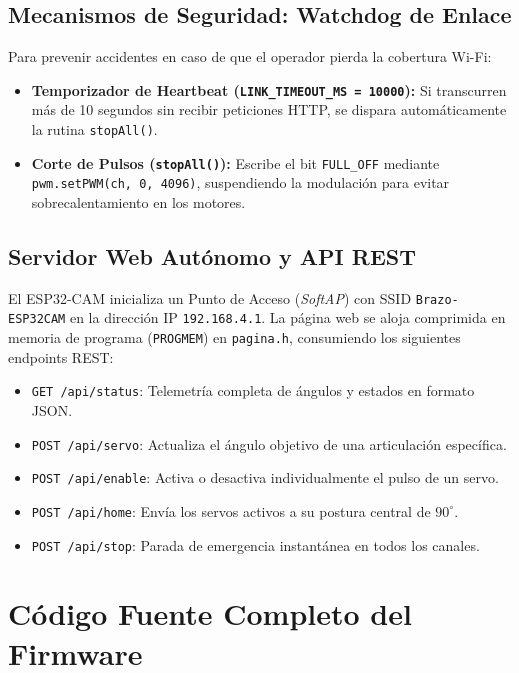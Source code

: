 \documentclass[11pt,a4paper]{article}
\begin{document}
\subsection{Mecanismos de Seguridad: Watchdog de Enlace}
Para prevenir accidentes en caso de que el operador pierda la cobertura Wi-Fi:
\begin{itemize}
    \item \textbf{Temporizador de Heartbeat (\texttt{LINK\_TIMEOUT\_MS = 10000}):} Si transcurren más de 10 segundos sin recibir peticiones HTTP, se dispara automáticamente la rutina \texttt{stopAll()}.
    \item \textbf{Corte de Pulsos (\texttt{stopAll()}):} Escribe el bit \texttt{FULL\_OFF} mediante \texttt{pwm.setPWM(ch, 0, 4096)}, suspendiendo la modulación para evitar sobrecalentamiento en los motores.
\end{itemize}

\subsection{Servidor Web Autónomo y API REST}
El ESP32-CAM inicializa un Punto de Acceso (\textit{SoftAP}) con SSID \texttt{Brazo-ESP32CAM} en la dirección IP \texttt{192.168.4.1}. La página web se aloja comprimida en memoria de programa (\texttt{PROGMEM}) en \texttt{pagina.h}, consumiendo los siguientes endpoints REST:
\begin{itemize}
    \item \texttt{GET /api/status}: Telemetría completa de ángulos y estados en formato JSON.
    \item \texttt{POST /api/servo}: Actualiza el ángulo objetivo de una articulación específica.
    \item \texttt{POST /api/enable}: Activa o desactiva individualmente el pulso de un servo.
    \item \texttt{POST /api/home}: Envía los servos activos a su postura central de $90^\circ$.
    \item \texttt{POST /api/stop}: Parada de emergencia instantánea en todos los canales.
\end{itemize}

\newpage

\section{Código Fuente Completo del Firmware}
\end{document}
